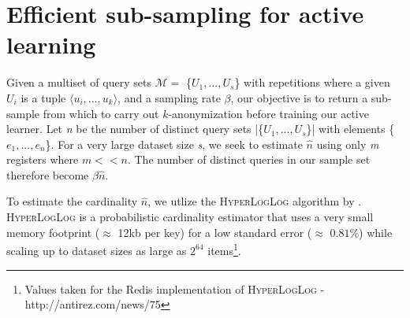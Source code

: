 \documentclass[letterpaper]{article}
\begin{document}
\section{Efficient sub-sampling for active learning}
\label{estimate_cardinality}

Given a multiset of query sets \begin{math} \mathcal{M} =  \end{math} \{\begin{math}U_1, ..., U_s \end{math}\} with repetitions where a given \begin{math} U_i \end{math} is a tuple \begin{math} \langle u_i, ..., u_k \rangle \end{math}, and a sampling rate $\beta$, our objective is to return a sub-sample from which to carry out $k$-anonymization before training our active learner. Let \textit{n} be the number of distinct query sets |\{\begin{math} U_1, ..., U_s \end{math}\}| with elements \{\begin{math} e_1, ..., e_n \end{math}\}. For a very large dataset size \textit{s}, we seek to estimate \begin{math} \hat{n} \end{math} using only \textit{m} registers where \begin{math} m << n \end{math}. The number of distinct queries in our sample set therefore become $\beta\hat{n}$.

To estimate the cardinality \begin{math} \hat{n} \end{math}, we utlize the \textsc{HyperLogLog} algorithm by \cite{flajolet2007hyperloglog}. \textsc{HyperLogLog} is a probabilistic cardinality estimator that uses a very small memory footprint (\begin{math} \approx \end{math} 12kb per key) for a low standard error (\begin{math} \approx \end{math} $0.81$\%) while scaling up to dataset sizes as large as \begin{math} 2^{64} \end{math} items\footnote{Values taken for the Redis implementation of \textsc{HyperLogLog} - http://antirez.com/news/75}.
\end{document}
